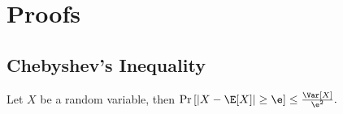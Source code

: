 \balance
\section{Proofs} \label{sec:proofs}



\subsection{Chebyshev's Inequality} \label{sec:chebyshev}
\vspace{-1mm}\begin{lemma} \label{lmm:chebysev}
	Let $X$ be a random variable, then $\Pr\left[\left| X -\E[X]\right| \geq \e\right] \le {\Var[X] \over \e^2 }. $
\end{lemma}


